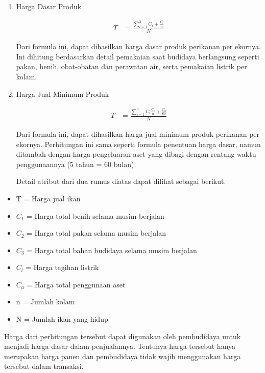 \begin{enumerate}
	\item Harga Dasar Produk
	
	\begin{equation}
		\begin{split}
			T
			&= \frac{\sum_{i=1}^3 C_i + \frac{C_l}{n}}{N}
		\end{split}
	\end{equation}

	Dari formula ini, dapat dihasilkan harga dasar produk perikanan per ekornya. Ini dihitung berdasarkan detail pemakaian saat budidaya berlangsung seperti pakan, benih, obat-obatan dan perawatan air, serta pemakaian listrik per kolam.

	\item Harga Jual Minimum Produk
	
	\begin{equation}
		\begin{split}
			T
			&= \frac{\sum_{i=1}^3 C_i \frac{C_l}{n} + \frac{C_a}{60}}{N}
		\end{split}
	\end{equation}

	Dari formula ini, dapat dihasilkan harga jual minimum produk perikanan per ekornya. Perhitungan ini sama seperti formula penentuan harga dasar, namun ditambah dengan harga pengeluaran aset yang dibagi dengan rentang waktu penggunaannya (5 tahun = 60 bulan).

	Detail atribut dari dua rumus diatas dapat dilihat sebagai berikut.

\end{enumerate}

\begin{itemize}
	\item T = Harga jual ikan
	\item $C_1$ = Harga total benih selama musim berjalan
	\item $C_2$ = Harga total pakan selama musim berjalan
	\item $C_3$ = Harga total bahan budidaya selama musim berjalan
	\item $C_l$ = Harga tagihan listrik
	\item $C_a$ = Harga total penggunaan aset
	\item n = Jumlah kolam
	\item N = Jumlah ikan yang hidup
\end{itemize}	

Harga dari perhitungan tersebut dapat digunakan oleh pembudidaya untuk menjadi harga dasar dalam penjualannya. Tentunya harga tersebut hanya merupakan harga panen dan pembudidaya tidak wajib menggunakan harga tersebut dalam transaksi.


